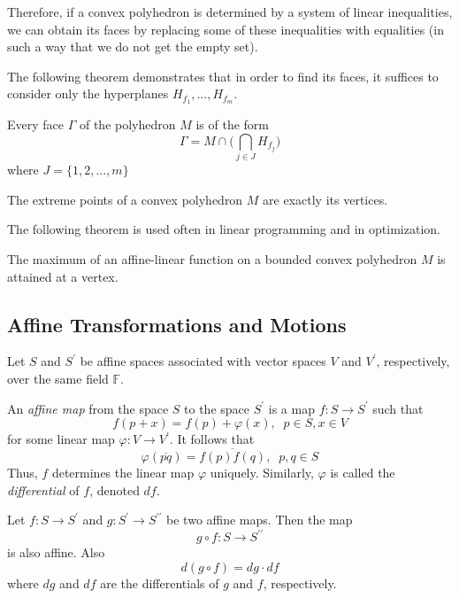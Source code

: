 \documentclass{article}
\begin{document}
    Therefore, if a convex polyhedron is determined by a system of linear inequalities, we can obtain its faces by replacing some of these inequalities with equalities (in such a way that we do not get the empty set). 

    The following theorem demonstrates that in order to find its faces, it suffices to consider only the hyperplanes $H_{f_1}, ..., H_{f_m}$. 

    \begin{theorem}
    Every face $\Gamma$ of the polyhedron $M$ is of the form
    \[\Gamma = M \cap \bigg( \bigcap_{j \in J} H_{f_j} \bigg)\]
    where $J = \{1, 2, ..., m\}$
    \end{theorem}

    \begin{proposition}
    The extreme points of a convex polyhedron $M$ are exactly its vertices. 
    \end{proposition}

    The following theorem is used often in linear programming and in optimization. 

    \begin{theorem}
    The maximum of an affine-linear function on a bounded convex polyhedron $M$ is attained at a vertex. 
    \end{theorem}

  \subsection{Affine Transformations and Motions}

    Let $S$ and $S^\prime$ be affine spaces associated with vector spaces $V$ and $V^\prime$, respectively, over the same field $\mathbb{F}$. 

    \begin{definition}
    An \textit{affine map} from the space $S$ to the space $S^\prime$ is a map $f: S \longrightarrow S^\prime$ such that
    \[f(p+x) = f(p) + \varphi(x), \;\; p \in S, x \in V\]
    for some linear map $\varphi: V \longrightarrow V^\prime$. It follows that
    \[\varphi(\overline{pq}) = \overline{f(p) f(q)}, \;\; p, q \in S\]
    Thus, $f$ determines the linear map $\varphi$ uniquely. Similarly, $\varphi$ is called the \textit{differential} of $f$, denoted $df$. 
    \end{definition}

    \begin{proposition}
    Let $f: S \longrightarrow S^\prime$ and $g: S^\prime \longrightarrow S^{\prime \prime}$ be two affine maps. Then the map
    \[g \circ f : S \longrightarrow S^{\prime\prime}\]
    is also affine. Also
    \[d(g \circ f) = dg \cdot df\]
    where $dg$ and $df$ are the differentials of $g$ and $f$, respectively. 
    \end{proposition}
\end{document}
